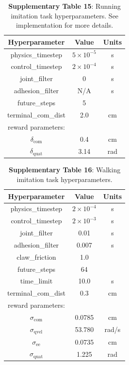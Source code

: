 \documentclass[sn-mathphys-num]{sn-jnl}%
\theoremstyle{thmstyleone}	%
\theoremstyle{thmstyletwo}	%
\theoremstyle{thmstylethree}	%
\begin{document}
\begin{appendices}
\begin{table}[htbp]
	\centering
	\small
	\caption{\textbf{Supplementary Table 15}:
		Running imitation task hyperparameters.
		See implementation for more details.
	}
	\begin{tabular}{ccc}
		\toprule
		\textbf{Hyperparameter}        &        \textbf{Value}  & \textbf{Units}   \\
		\midrule
		physics\_timestep     &  $ 5 \times 10^{-5} $     &  s \\
		control\_timestep     &  $ 2 \times 10^{-4} $     &  s \\
		joint\_filter     &  0     &  s \\
		adhesion\_filter     &  N/A     &  s \\
		future\_steps     &  5     &   \\
		terminal\_com\_dist     &  2.0     &  cm \\
		\midrule
		reward parameters:     &      &   \\
		$ \delta_\text{com} $     &  0.4     &  cm \\
		$ \delta_\text{quat} $     &  3.14     &  rad \\
		\bottomrule
	\end{tabular}%
	\label{tab:s_15}%
\end{table}%


\begin{table}[htbp]
	\centering
	\small
	\caption{\textbf{Supplementary Table 16}:
		Walking imitation task hyperparameters.
	}
	\begin{tabular}{ccc}
		\toprule
		\textbf{Hyperparameter}        &        \textbf{Value}  & \textbf{Units}   \\
		\midrule
		physics\_timestep     &  $ 2 \times 10^{-4} $     &  s \\
		control\_timestep     &  $ 2 \times 10^{-3} $     &  s \\
		joint\_filter     &  0.01     &  s \\
		adhesion\_filter     &  0.007     &  s \\
		claw\_friction     &  1.0     &   \\
		future\_steps     &  64     &   \\
		time\_limit     &  10.0     &  s \\
		terminal\_com\_dist     &  0.3     &  cm \\
		\midrule
		reward parameters:     &      &   \\
		$ \sigma _\text{com} $     &  0.0785     &  cm \\
		$ \sigma _\text{qvel} $     &  53.780     &  rad/s \\
		$ \sigma _\text{ee} $     &  0.0735     &  cm \\
		$ \sigma _\text{quat} $     &  1.225     &  rad \\
		\bottomrule
	\end{tabular}%
	\label{tab:s_16}%
\end{table}%




\end{appendices}
\end{document}
